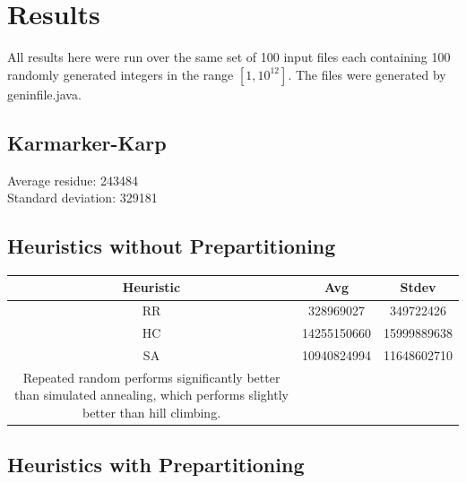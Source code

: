 \documentclass{article}
\begin{document}
\section*{Results}
All results here were run over the same set of 100 input files each containing 100 randomly generated integers in the range $[1, 10^{12}]$. The files were generated by geninfile.java. 
\subsection*{Karmarker-Karp}
Average residue: 243484\\
Standard deviation: 329181
\subsection*{Heuristics without Prepartitioning}
\begin{center}
\begin{tabular}{| c | c | c |}
\hline
Heuristic & Avg & Stdev \\
\hline\hline
RR & 328969027 & 349722426 \\
\hline
HC & 14255150660 & 15999889638\\
\hline
SA & 10940824994 & 11648602710 \\
\hline
Repeated random performs significantly better than simulated annealing, which performs slightly better than hill climbing. 
\end{tabular}
\end{center}
\subsection*{Heuristics with Prepartitioning}
\end{document}
